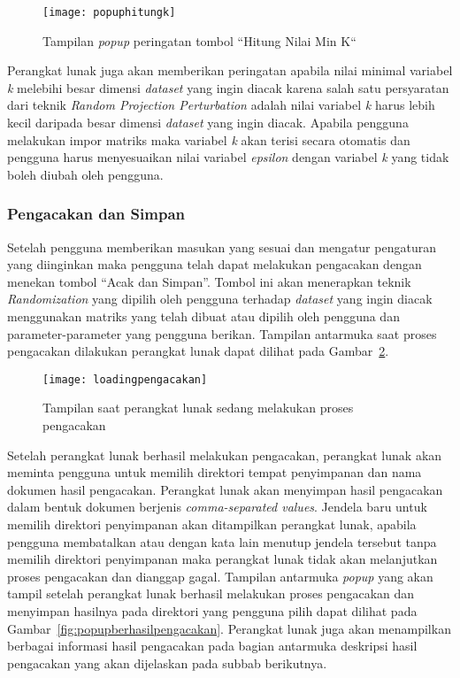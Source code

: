\begin{figure}
	\centering
	\texttt{[image: popuphitungk]}
	\caption{Tampilan \textit{popup} peringatan tombol \textquotedblleft Hitung Nilai Min K\textquotedblleft }
	\label{fig:popuphitungk}
\end{figure}

Perangkat lunak juga akan memberikan peringatan apabila nilai minimal variabel \textit{k} melebihi besar dimensi \textit{dataset} yang ingin diacak karena salah satu persyaratan dari teknik \textit{Random Projection Perturbation} adalah nilai variabel \textit{k} harus lebih kecil daripada besar dimensi \textit{dataset} yang ingin diacak. Apabila pengguna melakukan impor matriks maka variabel \textit{k} akan terisi secara otomatis dan pengguna harus menyesuaikan nilai variabel \textit{epsilon} dengan variabel \textit{k} yang tidak boleh diubah oleh pengguna. 

\subsubsection{Pengacakan dan Simpan}
\label{subsubsec:pengacakansimpan}

Setelah pengguna memberikan masukan yang sesuai dan mengatur pengaturan yang diinginkan maka pengguna telah dapat melakukan pengacakan dengan menekan tombol \textquotedblleft Acak dan Simpan\textquotedblright. Tombol ini akan menerapkan teknik \textit{Randomization} yang dipilih oleh pengguna terhadap \textit{dataset} yang ingin diacak menggunakan matriks yang telah dibuat atau dipilih oleh pengguna dan parameter-parameter yang pengguna berikan. Tampilan antarmuka saat proses pengacakan dilakukan perangkat lunak dapat dilihat pada Gambar~\ref{fig:loadingpengacakan}.

\begin{figure}
	\centering
	\texttt{[image: loadingpengacakan]}
	\caption{Tampilan saat perangkat lunak sedang melakukan proses pengacakan}
	\label{fig:loadingpengacakan}
\end{figure}

Setelah perangkat lunak berhasil melakukan pengacakan, perangkat lunak akan meminta pengguna untuk memilih direktori tempat penyimpanan dan nama dokumen hasil pengacakan. Perangkat lunak akan menyimpan hasil pengacakan dalam bentuk dokumen berjenis \textit{comma-separated values}. Jendela baru untuk memilih direktori penyimpanan akan ditampilkan perangkat lunak, apabila pengguna membatalkan atau dengan kata lain menutup jendela tersebut tanpa memilih direktori penyimpanan maka perangkat lunak tidak akan melanjutkan proses pengacakan dan dianggap gagal. Tampilan antarmuka \textit{popup} yang akan tampil setelah perangkat lunak berhasil melakukan proses pengacakan dan menyimpan hasilnya pada direktori yang pengguna pilih dapat dilihat pada Gambar~\ref{fig:popupberhasilpengacakan}. Perangkat lunak juga akan menampilkan berbagai informasi hasil pengacakan pada bagian antarmuka deskripsi hasil pengacakan yang akan dijelaskan pada subbab berikutnya.

